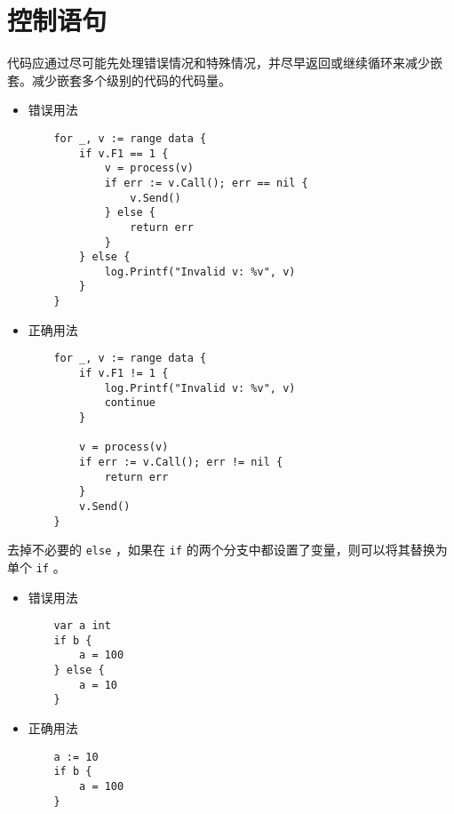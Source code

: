 \chapter{控制语句}
代码应通过尽可能先处理错误情况和特殊情况，并尽早返回或继续循环来减少嵌套。减少嵌套多个级别的代码的代码量。
\begin{itemize}[leftmargin=4em]
\item 错误用法

  \begin{verbatim}
    for _, v := range data {
    	if v.F1 == 1 {
    		v = process(v)
    		if err := v.Call(); err == nil {
    			v.Send()
    		} else {
    			return err
    		}
    	} else {
    		log.Printf("Invalid v: %v", v)
    	}
    }
  \end{verbatim}
\item 正确用法

  \begin{verbatim}
    for _, v := range data {
    	if v.F1 != 1 {
    		log.Printf("Invalid v: %v", v)
    		continue
    	}

    	v = process(v)
    	if err := v.Call(); err != nil {
    		return err
    	}
    	v.Send()
    }
  \end{verbatim}
\end{itemize}

去掉不必要的 \texttt{else} ，如果在 \texttt{if} 的两个分支中都设置了变量，则可以将其替换为单个 \texttt{if} 。
\begin{itemize}[leftmargin=4em]
\item 错误用法

  \begin{verbatim}
    var a int
    if b {
    	a = 100
    } else {
    	a = 10
    }
  \end{verbatim}
\item 正确用法

  \begin{verbatim}
    a := 10
    if b {
    	a = 100
    }
  \end{verbatim}
\end{itemize}
